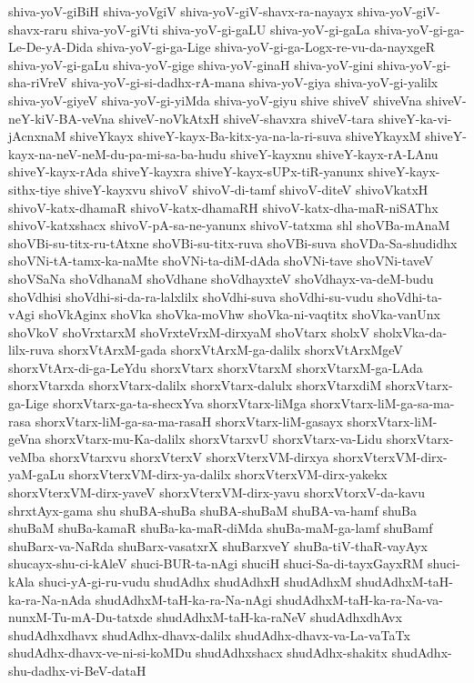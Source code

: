 {shiva-yoV-giBiH
shiva-yoVgiV
shiva-yoV-giV-shavx-ra-nayayx
shiva-yoV-giV-shavx-raru
shiva-yoV-giVti
shiva-yoV-gi-gaLU
shiva-yoV-gi-gaLa
shiva-yoV-gi-ga-Le-De-yA-Dida
shiva-yoV-gi-ga-Lige
shiva-yoV-gi-ga-Logx-re-vu-da-nayxgeR
shiva-yoV-gi-gaLu
shiva-yoV-gige
shiva-yoV-ginaH
shiva-yoV-gini
shiva-yoV-gi-sha-riVreV
shiva-yoV-gi-si-dadhx-rA-mana
shiva-yoV-giya
shiva-yoV-gi-yalilx
shiva-yoV-giyeV
shiva-yoV-gi-yiMda
shiva-yoV-giyu
shive
shiveV
shiveVna
shiveV-neY-kiV-BA-veVna
shiveV-noVkAtxH
shiveV-shavxra
shiveV-tara
shiveY-ka-vi-jAcnxnaM
shiveYkayx
shiveY-kayx-Ba-kitx-ya-na-la-ri-suva
shiveYkayxM
shiveY-kayx-na-neV-neM-du-pa-mi-sa-ba-hudu
shiveY-kayxnu
shiveY-kayx-rA-LAnu
shiveY-kayx-rAda
shiveY-kayxra
shiveY-kayx-sUPx-tiR-yanunx
shiveY-kayx-sithx-tiye
shiveY-kayxvu
shivoV
shivoV-di-tamf
shivoV-diteV
shivoVkatxH
shivoV-katx-dhamaR
shivoV-katx-dhamaRH
shivoV-katx-dha-maR-niSAThx
shivoV-katxshacx
shivoV-pA-sa-ne-yanunx
shivoV-tatxma
shl
shoVBa-mAnaM
shoVBi-su-titx-ru-tAtxne
shoVBi-su-titx-ruva
shoVBi-suva
shoVDa-Sa-shudidhx
shoVNi-tA-tamx-ka-naMte
shoVNi-ta-diM-dAda
shoVNi-tave
shoVNi-taveV
shoVSaNa
shoVdhanaM
shoVdhane
shoVdhayxteV
shoVdhayx-va-deM-budu
shoVdhisi
shoVdhi-si-da-ra-lalxlilx
shoVdhi-suva
shoVdhi-su-vudu
shoVdhi-ta-vAgi
shoVkAginx
shoVka
shoVka-moVhw
shoVka-ni-vaqtitx
shoVka-vanUnx
shoVkoV
shoVrxtarxM
shoVrxteVrxM-dirxyaM
shoVtarx
sholxV
sholxVka-da-lilx-ruva
shorxVtArxM-gada
shorxVtArxM-ga-dalilx
shorxVtArxMgeV
shorxVtArx-di-ga-LeYdu
shorxVtarx
shorxVtarxM
shorxVtarxM-ga-LAda
shorxVtarxda
shorxVtarx-dalilx
shorxVtarx-dalulx
shorxVtarxdiM
shorxVtarx-ga-Lige
shorxVtarx-ga-ta-shecxYva
shorxVtarx-liMga
shorxVtarx-liM-ga-sa-ma-rasa
shorxVtarx-liM-ga-sa-ma-rasaH
shorxVtarx-liM-gasayx
shorxVtarx-liM-geVna
shorxVtarx-mu-Ka-dalilx
shorxVtarxvU
shorxVtarx-va-Lidu
shorxVtarx-veMba
shorxVtarxvu
shorxVterxV
shorxVterxVM-dirxya
shorxVterxVM-dirx-yaM-gaLu
shorxVterxVM-dirx-ya-dalilx
shorxVterxVM-dirx-yakekx
shorxVterxVM-dirx-yaveV
shorxVterxVM-dirx-yavu
shorxVtorxV-da-kavu
shrxtAyx-gama
shu
shuBA-shuBa
shuBA-shuBaM
shuBA-va-hamf
shuBa
shuBaM
shuBa-kamaR
shuBa-ka-maR-diMda
shuBa-maM-ga-lamf
shuBamf
shuBarx-va-NaRda
shuBarx-vasatxrX
shuBarxveY
shuBa-tiV-thaR-vayAyx
shucayx-shu-ci-kAleV
shuci-BUR-ta-nAgi
shuciH
shuci-Sa-di-tayxGayxRM
shuci-kAla
shuci-yA-gi-ru-vudu
shudAdhx
shudAdhxH
shudAdhxM
shudAdhxM-taH-ka-ra-Na-nAda
shudAdhxM-taH-ka-ra-Na-nAgi
shudAdhxM-taH-ka-ra-Na-va-nunxM-Tu-mA-Du-tatxde
shudAdhxM-taH-ka-raNeV
shudAdhxdhAvx
shudAdhxdhavx
shudAdhx-dhavx-dalilx
shudAdhx-dhavx-va-La-vaTaTx
shudAdhx-dhavx-ve-ni-si-koMDu
shudAdhxshacx
shudAdhx-shakitx
shudAdhx-shu-dadhx-vi-BeV-dataH
}
